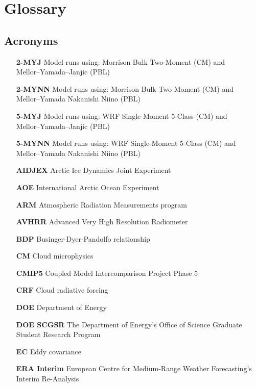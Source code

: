 \chapter{Glossary}
\section{Acronyms}
\begin{enumerate}
    \item[\textbf{2-MYJ}] Model runs using: Morrison Bulk Two-Moment (CM) and \\ 
    \hspace*{3.3cm} Mellor–Yamada–Janjic (PBL)
    \item[\textbf{2-MYNN}] Model runs using: Morrison Bulk Two-Moment (CM) and \\
    \hspace*{3.3cm} Mellor–Yamada Nakanishi Niino (PBL)
    \item[\textbf{5-MYJ}] Model runs using: WRF Single-Moment 5-Class (CM) and \\
    \hspace*{3.3cm} Mellor–Yamada–Janjic (PBL)
    \item[\textbf{5-MYNN}] Model runs using: WRF Single-Moment 5-Class (CM) and \\
    \hspace*{3.3cm} Mellor–Yamada Nakanishi Niino (PBL)
    \item[\textbf{AIDJEX}] Arctic Ice Dynamics Joint Experiment
    \item[\textbf{AOE}] International Arctic Ocean Experiment
    \item[\textbf{ARM}] Atmospheric Radiation Measurements program
    \item[\textbf{AVHRR}] Advanced Very High Resolution Radiometer 
    \item[\textbf{BDP}] Businger-Dyer-Pandolfo relationship
    \item[\textbf{CM}] Cloud microphysics
    \item[\textbf{CMIP5}] Coupled Model Intercomparison Project Phase 5
    \item[\textbf{CRF}] Cloud radiative forcing
    \item[\textbf{DOE}] Department of Energy
    \item[\textbf{DOE SCGSR}] The Department of Energy's Office of Science Graduate Student Research Program
    \item[\textbf{EC}] Eddy covariance 
    \item[\textbf{ERA Interim}] European Centre for Medium-Range Weather Forecasting’s Interim Re-Analysis

\end{enumerate}
